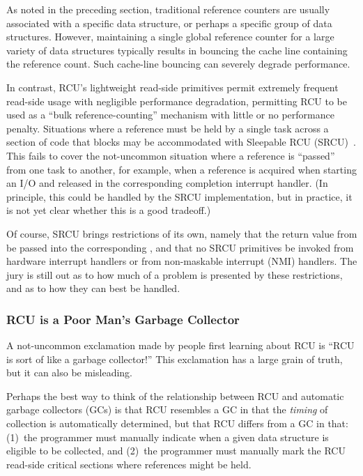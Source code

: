 As noted in the preceding section,
traditional reference counters are usually associated with a specific
data structure, or perhaps a specific group of data structures.
However, maintaining a single global reference counter for a large
variety of data structures typically results in bouncing
the cache line containing the reference count.
Such cache-line bouncing can severely degrade performance.

In contrast, RCU's lightweight read-side primitives permit
extremely frequent read-side usage with negligible performance
degradation, permitting RCU to be used as a ``bulk reference-counting''
mechanism with little or no performance penalty.
Situations where a reference must be held by a single task across a
section of code that blocks may be accommodated with
Sleepable RCU (SRCU)~\cite{PaulEMcKenney2006c}.
This fails to cover the not-uncommon situation where a reference is ``passed''
from one task to another, for example, when a reference is acquired
when starting an I/O and released in the corresponding completion
interrupt handler.
(In principle, this could be handled by the SRCU implementation,
but in practice, it is not yet clear whether this is a good tradeoff.)

Of course, SRCU brings restrictions of its own, namely that the
return value from  be passed into the
corresponding , and that no SRCU primitives
be invoked from hardware interrupt handlers or from non-maskable interrupt
(NMI) handlers.
The jury is still out as to how much of a problem is presented by
these restrictions, and as to how they can best be handled.

\subsubsection{RCU is a Poor Man's Garbage Collector}
\label{sec:defer:RCU is a Poor Man's Garbage Collector}

A not-uncommon exclamation made by people first learning about
RCU is ``RCU is sort of like a garbage collector!''
This exclamation has a large grain of truth, but it can also be
misleading.

Perhaps the best way to think of the relationship between RCU
and automatic garbage collectors (GCs) is that RCU resembles
a GC in that the \emph{timing} of collection is automatically
determined, but that RCU differs from a GC in that: (1)~the programmer
must manually indicate when a given data structure is eligible
to be collected, and (2)~the programmer must manually mark the
RCU read-side critical sections where references might be held.

